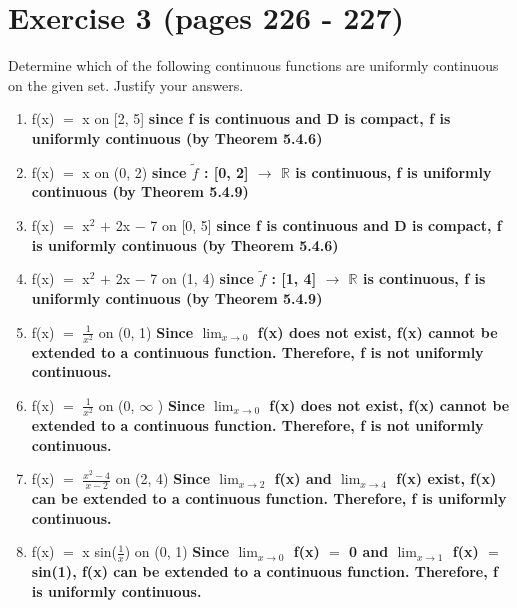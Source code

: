 \documentclass{article}
\newcommand{\mt}[1]{\ensuremath{#1}}
\newcommand\bsc[2][\DefaultOpt]{%
  \def\DefaultOpt{#2}%
  \section[#1]{#2}%
}
\newcommand{\balist}{\begin{enumerate}[label=\alph*.]}
\newcommand{\elist}{\end{enumerate}}
\newcommand{\br}{\mt{\mathbb{R}} }       %
\newcommand{\lra}{ \mt{\longrightarrow} } %
\newcommand{\ps}{\mt{+} }
\newcommand{\ms}{\mt{-} }
\newcommand{\eql}{\mt{=} }
\newcommand{\uf}[2]{#1\mt{^{#2}}}
\newcommand{\frc}[2]{\mt{\frac{#1}{#2}}}
\newcommand{\limt}[2]{\mt{\displaystyle{\lim_{#1 \to #2}}}}
\newcommand{\infy}{\mt{\infty} }
\newcommand{\wit}[1]{\mt{\widetilde{#1}}}
\begin{document}
\newpage

\bsc{Exercise 3 (pages 226 - 227)}{

Determine which of the following continuous functions are uniformly continuous on the given set. Justify your answers.

\balist
\item f(x) \eql x on [2, 5] \textbf{since f is continuous and D is compact, f is uniformly continuous (by Theorem 5.4.6)}
\item f(x) \eql x on (0, 2) \textbf{since \wit{f} : [0, 2] \lra \br is continuous, f is uniformly continuous (by Theorem 5.4.9)}
\item f(x) \eql \uf{x}{2} \ps 2x \ms 7 on [0, 5] \textbf{since f is continuous and D is compact, f is uniformly continuous (by Theorem 5.4.6)}
\item f(x) \eql \uf{x}{2} \ps 2x \ms 7 on (1, 4) \textbf{since \wit{f} : [1, 4] \lra \br is continuous, f is uniformly continuous (by Theorem 5.4.9)}
\item f(x) \eql \frc{1}{x^2} on (0, 1) \textbf{Since \limt{x}{0} f(x) does not exist, f(x) cannot be extended to a continuous function. Therefore, f is not uniformly continuous.}
\item f(x) \eql \frc{1}{x^2} on (0, \infy) \textbf{Since \limt{x}{0} f(x) does not exist, f(x) cannot be extended to a continuous function. Therefore, f is not uniformly continuous.}
\item f(x) \eql \frc{x^2 - 4}{x - 2} on (2, 4) \textbf{Since \limt{x}{2} f(x) and \limt{x}{4} f(x) exist, f(x) can be extended to a continuous function. Therefore, f is uniformly continuous.}
\item f(x) \eql x sin(\frc{1}{x}) on (0, 1) \textbf{Since \limt{x}{0} f(x) \eql 0 and \limt{x}{1} f(x) \eql sin(1), f(x) can be extended to a continuous function. Therefore, f is uniformly continuous.}
\elist

}

\newpage 
\end{document}
